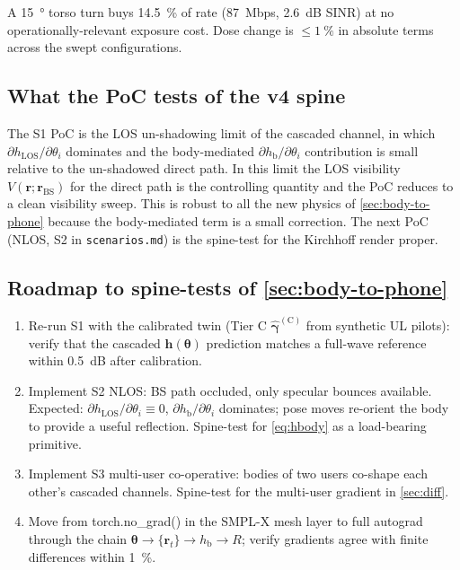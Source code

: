 \documentclass[11pt,a4paper]{article}
\theoremstyle{definition}
\newcommand{\rr}{\mathbf{r}}
\newcommand{\hh}{\mathbf{h}}
\newcommand{\thetab}{\bm{\theta}}
\newcommand{\hbody}{h_{\mathrm{b}}}
\newcommand{\hLOS}{h_{\mathrm{LOS}}}
\begin{document}
\noindent A \SI{15}{\degree} torso turn buys \SI{14.5}{\percent}
of rate (\SI{+87}{Mbps}, \SI{+2.6}{dB} SINR) at no
operationally-relevant exposure cost.  Dose change is
$\le\SI{1}{\percent}$ in absolute terms across the swept
configurations.

\subsection{What the PoC tests of the v4 spine}

The S1 PoC is the LOS un-shadowing limit of the cascaded channel,
in which $\partial\hLOS/\partial\theta_i$ dominates and the
body-mediated $\partial\hbody/\partial\theta_i$ contribution is
small relative to the un-shadowed direct path.  In this limit the
LOS visibility $V(\rr;\rr_{\mathrm{BS}})$ for the direct path is
the controlling quantity and the PoC reduces to a clean visibility
sweep.  This is robust to all the new physics of \cref{sec:body-to-phone}
because the body-mediated term is a small correction.  The next
PoC (NLOS, S2 in \texttt{scenarios.md}) is the spine-test for the
Kirchhoff render proper.

\subsection{Roadmap to spine-tests of \cref{sec:body-to-phone}}

\begin{enumerate}[leftmargin=1.6em,itemsep=2pt]
\item Re-run S1 with the calibrated twin (Tier C
$\hat{\bm\gamma}^{(\mathrm{C})}$ from synthetic UL pilots): verify
that the cascaded $\hh(\thetab)$ prediction matches a full-wave
reference within \SI{0.5}{dB} after calibration.
\item Implement S2 NLOS: BS path occluded, only specular bounces
available.  Expected: $\partial\hLOS/\partial\theta_i\equiv 0$,
$\partial\hbody/\partial\theta_i$ dominates; pose moves re-orient
the body to provide a useful reflection.  Spine-test for
\cref{eq:hbody} as a load-bearing primitive.
\item Implement S3 multi-user co-operative: bodies of two users
co-shape each other's cascaded channels.  Spine-test for the
multi-user gradient in \cref{sec:diff}.
\item Move from torch.no\_grad() in the SMPL-X mesh layer to
full autograd through the chain
$\thetab\to\{\rr_t\}\to\hbody\to R$; verify gradients agree with
finite differences within \SI{1}{\percent}.
\end{enumerate}
\end{document}
